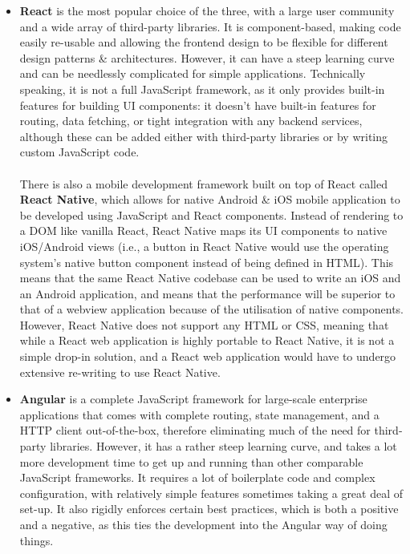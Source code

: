 \documentclass[a4paper,11pt]{report}
\begin{document}
\begin{itemize}
    \item   \textbf{React}\supercite{react} is the most popular choice of the three, with a large user community and a wide array of third-party libraries.
        It is component-based, making code easily re-usable and allowing the frontend design to be flexible for different design patterns \& architectures.
        However, it can have a steep learning curve and can be needlessly complicated for simple applications.
        Technically speaking, it is not a full JavaScript framework, as it only provides built-in features for building UI components: it doesn't have built-in features for routing, data fetching, or tight integration with any backend services, although these can be added either with third-party libraries or by writing custom JavaScript code.
        \\\\
        There is also a mobile development framework built on top of React called \textbf{React Native}\supercite{native}, which allows for native Android \& iOS mobile application to be developed using JavaScript and React components.
        Instead of rendering to a DOM like vanilla React, React Native maps its UI components to native iOS/Android views (i.e., a button in React Native would use the operating system's native button component instead of being defined in HTML).
        This means that the same React Native codebase can be used to write an iOS and an Android application, and means that the performance will be superior to that of a webview application because of the utilisation of native components.
        However, React Native does not support any HTML or CSS, meaning that while a React web application is highly portable to React Native, it is not a simple drop-in solution, and a React web application would have to undergo extensive re-writing to use React Native.

    \item   \textbf{Angular}\supercite{angular} is a complete JavaScript framework for large-scale enterprise applications that comes with complete routing, state management, and a HTTP client out-of-the-box, therefore eliminating much of the need for third-party libraries.
            However, it has a rather steep learning curve, and takes a lot more development time to get up and running than other comparable JavaScript frameworks.
            It requires a lot of boilerplate code and complex configuration, with relatively simple features sometimes taking a great deal of set-up.
            It also rigidly enforces certain best practices, which is both a positive and a negative, as this ties the development into the Angular way of doing things.


\end{itemize}
\end{document}
